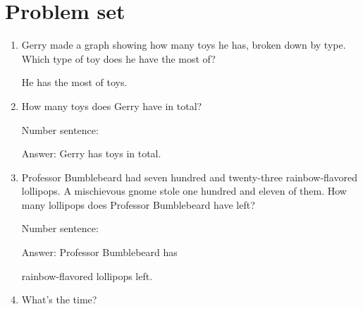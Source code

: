\documentclass{tufte-book}
\begin{document}
\clearpage\section{Problem set }

\begin{enumerate}

\item {}
Gerry made a graph showing how many toys he has, broken down by type.
Which type of toy does he have the most of?\medskip

He has the most of \dotfill\medskip
toys.

\item How many toys does Gerry have in total?\medskip

Number sentence: \dotfill\medskip

Answer: Gerry has \dotfill\medskip
toys in total.

\item
  Professor Bumblebeard had seven hundred and twenty-three
  rainbow-flavored lollipops. A mischievous gnome stole one hundred and
  eleven of them. How many lollipops does Professor Bumblebeard have
  left?\medskip\par
  Number sentence:
  \dotfill\medskip\par
  Answer: Professor Bumblebeard has
  \dotfill\medskip\par\mbox{}\dotfill\medskip\par\mbox{}\dotfill\bigskip
  rainbow-flavored lollipops left.

\item {}
What's the time?\medskip


\end{enumerate}
\end{document}
